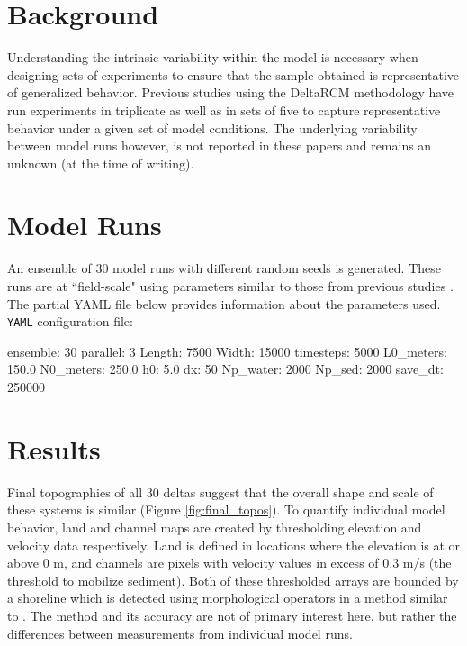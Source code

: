 \section{Background}
Understanding the intrinsic variability within the model is necessary when designing sets of experiments to ensure that the sample obtained is representative of generalized behavior.
Previous studies using the DeltaRCM methodology have run experiments in triplicate \cite{Liang2016a, Lauzon2018, Lauzon2019} as well as in sets of five \cite{Liang2016} to capture representative behavior under a given set of model conditions.
The underlying variability between model runs however, is not reported in these papers and remains an unknown (at the time of writing). 

\section{Model Runs}
\label{sec:standard_model_runs}
An ensemble of 30 model runs with different random seeds is generated.
These runs are at ``field-scale" using parameters similar to those from previous studies \cite{Liang2016, Liang2016a}.
The partial YAML file below provides information about the parameters used.\\

\noindent \texttt{YAML} configuration file: \vspace{-6pt}
\begin{boxedverbatim}
ensemble: 30
parallel: 3
Length: 7500
Width: 15000
timesteps: 5000
L0_meters: 150.0
N0_meters: 250.0
h0: 5.0
dx: 50
Np_water: 2000
Np_sed: 2000
save_dt: 250000
\end{boxedverbatim}

\section{Results}

Final topographies of all 30 deltas suggest that the overall shape and scale of these systems is similar (Figure \ref{fig:final_topos}). 
To quantify individual model behavior, land and channel maps are created by thresholding elevation and velocity data respectively.
Land is defined in locations where the elevation is at or above 0 m, and channels are pixels with velocity values in excess of 0.3 m/s (the threshold to mobilize sediment). 
Both of these thresholded arrays are bounded by a shoreline which is detected using morphological operators in a method similar to \citet{Geleynse2012}.
The method and its accuracy are not of primary interest here, but rather the differences between measurements from individual model runs. 

